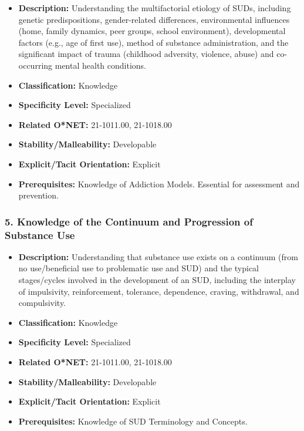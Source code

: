 \documentclass[
  letterpaper,
  DIV=11,
  numbers=noendperiod]{scrartcl}
\providecommand{\tightlist}{%
  \setlength{\itemsep}{0pt}\setlength{\parskip}{0pt}}
\begin{document}
\begin{itemize}
\tightlist
\item
  \textbf{Description:} Understanding the multifactorial etiology of
  SUDs, including genetic predispositions, gender-related differences,
  environmental influences (home, family dynamics, peer groups, school
  environment), developmental factors (e.g., age of first use), method
  of substance administration, and the significant impact of trauma
  (childhood adversity, violence, abuse) and co-occurring mental health
  conditions.
\item
  \textbf{Classification:} Knowledge
\item
  \textbf{Specificity Level:} Specialized
\item
  \textbf{Related O*NET:} 21-1011.00, 21-1018.00
\item
  \textbf{Stability/Malleability:} Developable
\item
  \textbf{Explicit/Tacit Orientation:} Explicit
\item
  \textbf{Prerequisites:} Knowledge of Addiction Models. Essential for
  assessment and prevention.
\end{itemize}

\subsubsection{5. Knowledge of the Continuum and Progression of
Substance
Use}\label{knowledge-of-the-continuum-and-progression-of-substance-use}

\begin{itemize}
\tightlist
\item
  \textbf{Description:} Understanding that substance use exists on a
  continuum (from no use/beneficial use to problematic use and SUD) and
  the typical stages/cycles involved in the development of an SUD,
  including the interplay of impulsivity, reinforcement, tolerance,
  dependence, craving, withdrawal, and compulsivity.
\item
  \textbf{Classification:} Knowledge
\item
  \textbf{Specificity Level:} Specialized
\item
  \textbf{Related O*NET:} 21-1011.00, 21-1018.00
\item
  \textbf{Stability/Malleability:} Developable
\item
  \textbf{Explicit/Tacit Orientation:} Explicit
\item
  \textbf{Prerequisites:} Knowledge of SUD Terminology and Concepts.
\end{itemize}
\end{document}
